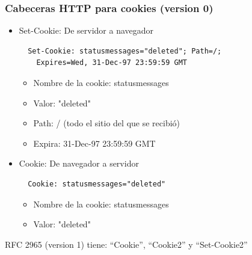 \begin{frame}[fragile]
\frametitle{Cabeceras HTTP para cookies (version 0)}

\begin{itemize}
\item Set-Cookie: De servidor a navegador \\

\begin{verbatim}
  Set-Cookie: statusmessages="deleted"; Path=/; 
    Expires=Wed, 31-Dec-97 23:59:59 GMT
\end{verbatim}

\begin{itemize}
\item Nombre de la cookie: statusmessages
\item Valor: "deleted"
\item Path: / (todo el sitio del que se recibió)
\item Expira: 31-Dec-97 23:59:59 GMT
\end{itemize}

\item Cookie: De navegador a servidor \\

\begin{verbatim}
  Cookie: statusmessages="deleted"
\end{verbatim}

\begin{itemize}
\item Nombre de la cookie: statusmessages
\item Valor: "deleted"
\end{itemize}

\end{itemize}

RFC 2965 (version 1) tiene: ``Cookie'', ``Cookie2'' y ``Set-Cookie2''
\end{frame}

